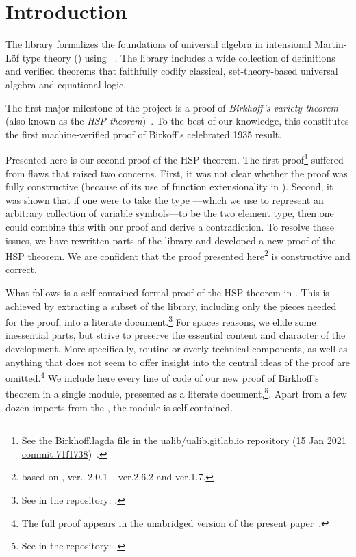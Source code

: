 \section{Introduction}
The \agdaalgebras library \cite{ualib_v2.0.1} formalizes the foundations of universal algebra
in intensional Martin-Löf type theory (\mltt) using \agda~\cite{Norell:2007,agdaref}.
The library includes a wide collection of definitions and verified theorems that faithfully codify
classical, set-theory-based universal algebra and equational
logic.

The first major milestone of the \agdaalgebras project is a proof of \emph{Birkhoff's
variety theorem} (also known as the \emph{HSP theorem})~\cite{Birkhoff:1935}.
To the best of our knowledge, this constitutes the first machine-verified proof of Birkoff's
celebrated 1935 result.

Presented here is our second proof of the HSP theorem. The first proof\footnote{See the
 \href{https://github.com/ualib/ualib.github.io/blob/71f173858701398d56224dd79d152c380c0c2b5e/src/lagda/UALib/Birkhoff.lagda}{\textsf{Birkhoff.lagda}} file
 in the \href{https://github.com/ualib/ualib.github.io}{\textsf{ualib/ualib.gitlab.io}}
 repository (\href{https://github.com/ualib/ualib.github.io/commit/71f173858701398d56224dd79d152c380c0c2b5e}{15
 Jan 2021 commit 71f1738})~\cite{ualib_v1.0.0}.}
suffered from flaws that raised two concerns. First, it was not clear whether the
proof was fully constructive (because of its use of function extensionality in \mltt). Second,
it was shown that if one were to take the type
---which we use to represent an arbitrary collection of
variable symbols---to be  the two element type, then one could combine this with our
proof and derive a contradiction. To resolve these issues, we have rewritten parts of the library and
developed a new proof of the HSP theorem. We are confident that the
proof presented here\footnote{based on \agdaalgebras, ver.~2.0.1~\cite{ualib_v2.0.1}, \agda ver.2.6.2 and \agdastdlib ver.1.7.} is constructive and
 correct. %

What follows is a self-contained formal proof of the HSP theorem in \agda.  This is achieved by
extracting a subset of the \agdaalgebras library, including only the
pieces needed for the proof, into a literate \agda document.\footnote{See
\HSPlagda in the \agdaalgebras repository: \agdaalgebrasrepo .}
\ifshort
For spaces reasons, we elide some inessential parts,
but strive to preserve the essential content and character of the development.
More specifically, routine or overly technical components, as well as anything that does not
seem to offer insight into the central ideas of the proof are omitted.\footnote{The full proof
appears in the unabridged version of the present paper~\cite{DeMeo:2021}.}
\else
We include here every line of code of our new proof of Birkhoff's theorem
in a single \agda module, presented as a literate \agda document,\footnote{See
\HSPlagda in the \agdaalgebras repository: \agdaalgebrasrepo .}.  Apart from a few dozen
imports from the \agdastdlib, the module is self-contained.
\fi

